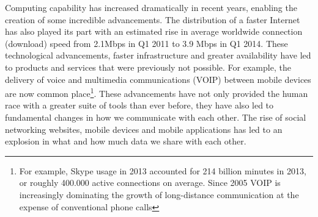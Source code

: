 \documentclass[twocolumn,english]{article}
\begin{document}
Computing capability has increased dramatically in recent years, enabling
the creation of some incredible advancements. %
The distribution of a faster Internet has also played its part with an estimated rise in average worldwide connection (download)
speed from 2.1Mbps in Q1 2011 to 3.9 Mbps in Q1 2014\cite{statisticaInternet14}.
These technological advancements, faster infrastructure and greater
availability have led to products and services that were previously
not possible. For example, the delivery of voice and multimedia communications
(VOIP) between mobile devices are now common place\footnote{For example, Skype usage in 2013 accounted for 214 billion minutes in 2013\cite{nay14}, or roughly 400.000 active connections on average. Since 2005 VOIP is increasingly dominating the growth of long-distance communication at the expense of conventional phone calls\cite{telegeography14}}.
These advancements have not only provided the human race with a greater
suite of tools than ever before, they have also led to fundamental
changes in how we communicate with each other. The rise of social
networking websites, mobile devices and mobile applications has led
to an explosion in what and how much data we share with each other.
\end{document}

